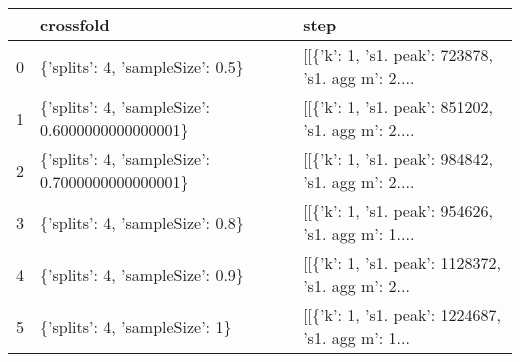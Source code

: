 \begin{tabular}{lll}
\toprule
{} &                                        crossfold &                                               step \\
\midrule
0 &                 \{'splits': 4, 'sampleSize': 0.5\} &  [[\{'k': 1, 's1. peak': 723878, 's1. agg m': 2.... \\
1 &  \{'splits': 4, 'sampleSize': 0.6000000000000001\} &  [[\{'k': 1, 's1. peak': 851202, 's1. agg m': 2.... \\
2 &  \{'splits': 4, 'sampleSize': 0.7000000000000001\} &  [[\{'k': 1, 's1. peak': 984842, 's1. agg m': 2.... \\
3 &                 \{'splits': 4, 'sampleSize': 0.8\} &  [[\{'k': 1, 's1. peak': 954626, 's1. agg m': 1.... \\
4 &                 \{'splits': 4, 'sampleSize': 0.9\} &  [[\{'k': 1, 's1. peak': 1128372, 's1. agg m': 2... \\
5 &                   \{'splits': 4, 'sampleSize': 1\} &  [[\{'k': 1, 's1. peak': 1224687, 's1. agg m': 1... \\
\bottomrule
\end{tabular}

